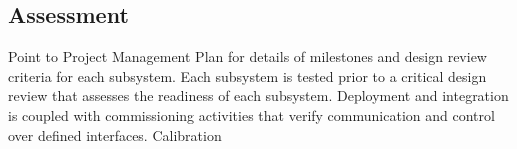 \documentclass[preprint]{aastex}
\begin{document}

\subsection{Assessment}

Point to Project Management Plan for details of milestones and design review criteria for each subsystem.
Each subsystem is tested prior to a critical design review that assesses the readiness of each subsystem.
Deployment and integration is coupled with commissioning activities that verify communication and control over defined interfaces.
Calibration 
\end{document}
